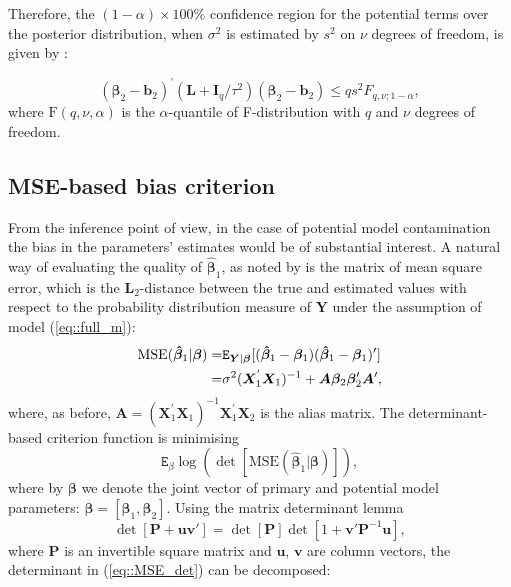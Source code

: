 Therefore, the $(1-\alpha)\times100\%$ confidence region for the potential terms over the posterior distribution, when $\sigma^2$ is estimated by $s^2$ on $\nu$ degrees of freedom, is given by \citep{Draper1998}:

$$(\bm{\beta}_{2}-\bm{b}_{2})^{'}(\bm{L}+\bm{I}_{q}/\tau^{2})(\bm{\beta}_{2}-\bm{b}_{2})\leq qs^{2}F_{q,\nu;1-\alpha},$$
where $\mathrm{F}(q,\nu,\alpha)$ is the $\alpha$-quantile of F-distribution with $q$ and $\nu$ degrees of freedom.\\ 

\subsection{MSE-based bias criterion}
From the inference point of view, in the case of potential model contamination the bias in the parameters' estimates would be of substantial interest. A natural way of evaluating the quality of $\bm{\hat{\beta}}_{1}$, as noted by \citet{FedorovMontepiedra1997} is the matrix of  mean square error, which is the $\bm{L}_2$-distance between the true and estimated values with respect to the probability distribution measure of $\bm{Y}$ under the assumption of model (\ref{eq::full_m}):
\begin{align}
\label{eq::MSE}
\mbox{MSE}(\bm{\hat{\beta}}_1|\bm{\beta})=&\mathtt{E}_{\bm{Y}|\bm{\beta}}[(\bm{\hat{\beta}}_1-\bm{\beta}_1)(\bm{\hat{\beta}}_1-\bm{\beta}_1)']\notag\\=&\sigma^2(\bm{X}_1^{'}\bm{X}_1)^{-1}+\bm{A}\bm{\beta}_2\bm{\beta}_2'\bm{A}', 
\end{align}
where, as before, $\bm{A}=(\bm{X}_1^{'}\bm{X}_1)^{-1}\bm{X}_1^{'}\bm{X}_2$ is the alias matrix.
The determinant-based criterion function is minimising
\begin{equation}
\label{eq::MSE_det}
\mathtt{E}_{\beta}\log(\det[\mbox{MSE}(\bm{\hat{\beta}}_1|\bm{\beta})]),
\end{equation}
where by $\bm{\beta}$ we denote the joint vector of primary and potential model parameters: $\bm{\beta}=[\bm{\beta}_1, \bm{\beta}_2]$.
Using the matrix determinant lemma \citep{Harville2006matrix}
\begin{equation*}
\det[\bm{P}+\bm{uv}']=\det[\bm{P}]\det[1+\bm{v'}\bm{P}^{-1}\bm{u}], 
\end{equation*}
where $\bm{P}$ is an invertible square matrix and $\bm{u}$, $\bm{v}$ are column vectors, the determinant in (\ref{eq::MSE_det}) can be decomposed:
